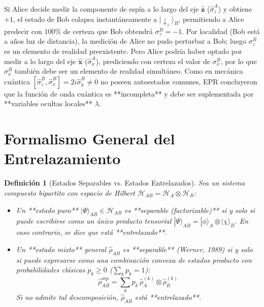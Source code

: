 \documentclass[11pt,a4paper]{book}
\newtheorem{definicion}{Definición}[chapter]
\begin{document}
Si Alice decide medir la componente de espín a lo largo del eje $\hat{\mathbf{z}}$ ($\hat{\sigma}_z^A$) y obtiene $+1$, el estado de Bob colapsa instantáneamente a $|\downarrow_z\rangle_B$, permitiendo a Alice predecir con $100\%$ de certeza que Bob obtendrá $\sigma_z^B = -1$. Por localidad (Bob está a años luz de distancia), la medición de Alice no pudo perturbar a Bob; luego $\sigma_z^B$ es un elemento de realidad preexistente. Pero Alice podría haber optado por medir a lo largo del eje $\hat{\mathbf{x}}$ ($\hat{\sigma}_x^A$), prediciendo con certeza el valor de $\sigma_x^B$, por lo que $\sigma_x^B$ también debe ser un elemento de realidad simultáneo. Como en mecánica cuántica $[\hat{\sigma}_z^B, \hat{\sigma}_x^B] = 2i\hat{\sigma}_y^B \neq 0$ no poseen autoestados comunes, EPR concluyeron que la función de onda cuántica es **incompleta** y debe ser suplementada por **variables ocultas locales** $\lambda$.

\section[Formalismo del entrelazamiento]{Formalismo General del Entrelazamiento}

\begin{definicion}[Estados Separables vs. Estados Entrelazados]
Sea un sistema compuesto bipartito con espacio de Hilbert $\mathcal{H}_{AB} = \mathcal{H}_A \otimes \mathcal{H}_B$:
\begin{itemize}
    \item Un **estado puro** $|\Psi\rangle_{AB} \in \mathcal{H}_{AB}$ es **separable (factorizable)** si y solo si puede escribirse como un único producto tensorial $|\Psi\rangle_{AB} = |\phi\rangle_A \otimes |\chi\rangle_B$. En caso contrario, se dice que está **entrelazado**.
    \item Un **estado mixto** general $\hat{\rho}_{AB}$ es **separable** (Werner, 1989) si y solo si puede expresarse como una combinación convexa de estados producto con probabilidades clásicas $p_k \geq 0$ ($\sum_k p_k = 1$):
    \begin{equation}
    \hat{\rho}_{AB}^{\text{sep}} = \sum_{k} p_k \, \hat{\rho}_A^{(k)} \otimes \hat{\rho}_B^{(k)}
    \end{equation}
    Si no admite tal descomposición, $\hat{\rho}_{AB}$ está **entrelazado**.
\end{itemize}
\end{definicion}
\end{document}
